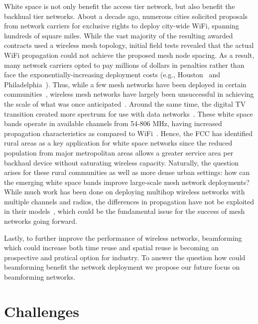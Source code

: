 White space is not only benefit the access tier network, but also benefit the 
backhual tier networks. About a decade ago, numerous cities solicited proposals from
network carriers for exclusive rights to deploy city-wide WiFi,
spanning hundreds of square miles.  
While the vast majority of the resulting awarded contracts used
a wireless mesh topology, initial field tests revealed that the 
actual WiFi propagation could not achieve the proposed mesh node
spacing. As a result, many network carriers opted to pay millions of 
dollars in penalties rather than face the exponentially-increasing
deployment costs (e.g., Houston~\cite{cnet_aug07} and 
Philadelphia~\cite{arstechnica_may08}). Thus, while a few mesh 
networks have been deployed in certain communities~\cite{CRSK06,google_imc08},
wireless mesh networks have largely been unsuccessful in achieving 
the scale of what was once anticipated~\cite{taps}.
Around the same time, the digital TV transition created more
spectrum for use with data networks~\cite{fccwhitespace}. These white 
space bands operate in available channels from 54-806 MHz, having
increased propagation characteristics as compared to 
WiFi~\cite{balanis2012antenna}. Hence, the FCC has identified rural
areas as a key application for white space networks since the reduced
population from major metropolitan areas allows a greater service area
per backhaul device without saturating wireless capacity. Naturally, 
the question arises for these rural communities as well as more dense 
urban settings: how can the emerging white space bands improve 
large-scale mesh network deployments?  While much work has been done 
on deploying multihop wireless networks with multiple channels and 
radios, the differences in propagation have not be exploited in their 
models~\cite{raniwala2004centralized,tang2005interference, si2010overview}, 
which could be the fundamental issue for the success of mesh 
networks going forward.

Lastly, to further improve the performance of wireless networks, 
beamforming which could increase both time reuse and spatial reuse
is becoming an prospective and pratical option for industry. To answer
the question how could beamforming benefit the network deployment we 
propose our future focus on beamforming networks.

\section{Challenges}



